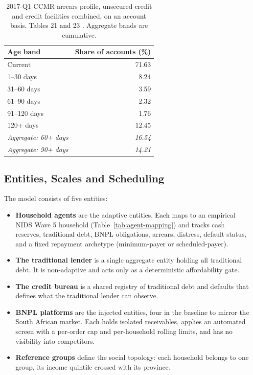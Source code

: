 \begin{table}[H]
\centering
\caption{2017-Q1 \ac{CCMR} arrears profile, unsecured credit and credit facilities combined, on an
account basis. Tables 21 and 23 \cite{ncr_ccmr_2017}. Aggregate bands are cumulative.}
\label{tab:ccmr}
\begin{tabular}{lr}
\toprule
\textbf{Age band} & \textbf{Share of accounts (\%)} \\
\midrule
Current                  & 71.63 \\
1--30 days               &  8.24 \\
31--60 days              &  3.59 \\
61--90 days              &  2.32 \\
91--120 days             &  1.76 \\
120+ days                & 12.45 \\
\midrule
\emph{Aggregate: 60+ days}  & \emph{16.54} \\
\emph{Aggregate: 90+ days}  & \emph{14.21} \\
\bottomrule
\end{tabular}
\end{table}

\subsection{Entities, Scales and Scheduling}
\label{sec:entities}

The model consists of five entities:
\begin{itemize}
    \item \textbf{Household agents} are the adaptive entities. Each maps to an empirical
    \ac{NIDS} Wave 5 household (Table~\ref{tab:agent-mapping}) and tracks cash reserves,
    traditional debt, \ac{BNPL} obligations, arrears, distress, default status, and a fixed
    repayment archetype (minimum-payer or scheduled-payer).
    \item \textbf{The traditional lender} is a single aggregate entity holding all traditional
    debt. It is non-adaptive and acts only as a deterministic affordability gate.
    \item \textbf{The credit bureau} is a shared registry of traditional debt and defaults that
    defines what the traditional lender can observe.
    \item \textbf{\ac{BNPL} platforms} are the injected entities, four in the baseline to mirror
    the South African market. Each holds isolated receivables, applies an automated screen with a
    per-order cap and per-household rolling limits, and has no visibility into competitors.
    \item \textbf{Reference groups} define the social topology: each household belongs to one
    group, its income quintile crossed with its province.
\end{itemize}


